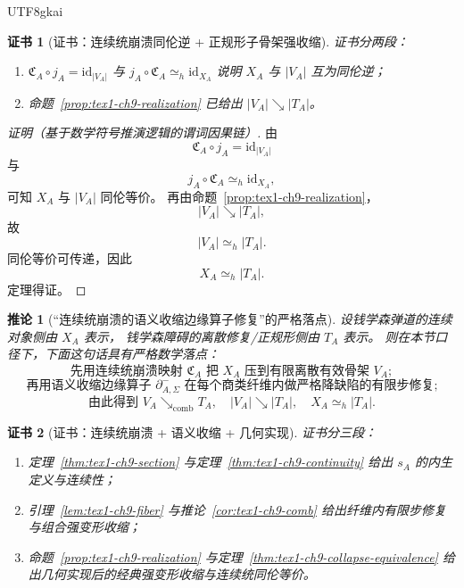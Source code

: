 \documentclass[12pt]{article}
\newtheorem{corollary}{推论}[section]
\newtheorem{Certificate}{证书}[section]
\newcommand{\id}{\mathrm{id}}
\begin{document}
\begin{CJK*}{UTF8}{gkai}
\begin{Certificate}[证书：连续统崩溃同伦逆 + 正规形子骨架强收缩]
\label{cert:tex1-ch9-collapse-equivalence}
证书分两段：
\begin{enumerate}
  \item \(\mathfrak C_A\circ j_A=\id_{|V_A|}\) 与 \(j_A\circ \mathfrak C_A \simeq_h \id_{X_A}\) 说明 \(X_A\) 与 \(|V_A|\)
    互为同伦逆；
  \item 命题~\ref{prop:tex1-ch9-realization} 已给出 \(|V_A|\searrow |T_A|\)。
\end{enumerate}
\end{Certificate}

\begin{proof}[证明（基于数学符号推演逻辑的谓词因果链）]
由
\[
  \mathfrak C_A\circ j_A=\id_{|V_A|}
\]
与
\[
  j_A\circ \mathfrak C_A \simeq_h \id_{X_A},
\]
可知 \(X_A\) 与 \(|V_A|\) 同伦等价。
再由命题~\ref{prop:tex1-ch9-realization}，
\[
  |V_A|\searrow |T_A|,
\]
故
\[
  |V_A|\simeq_h |T_A|.
\]
同伦等价可传递，因此
\[
  X_A \simeq_h |T_A|.
\]
定理得证。
\end{proof}

\begin{corollary}[“连续统崩溃的语义收缩边缘算子修复”的严格落点]
\label{cor:tex1-ch9-final}
设钱学森弹道的连续对象侧由 \(X_A\) 表示，
钱学森障碍的离散修复/正规形侧由 \(T_A\) 表示。
则在本节口径下，下面这句话具有严格数学落点：
\[
  \boxed{
    \text{先用连续统崩溃映射 }\mathfrak C_A\text{ 把 }X_A\text{ 压到有限离散有效骨架 }V_A;
  }
\]
\[
  \boxed{
    \text{再用语义收缩边缘算子 }\partial^-_{A,\Sigma}\text{ 在每个商类纤维内做严格降缺陷的有限步修复;}
  }
\]
\[
  \boxed{
    \text{由此得到 }V_A\searrow_{\mathrm{comb}}T_A,\quad |V_A|\searrow |T_A|,\quad X_A\simeq_h |T_A|.
  }
\]
\end{corollary}

\begin{Certificate}[证书：连续统崩溃 + 语义收缩 + 几何实现]
\label{cert:tex1-ch9-final}
证书分三段：
\begin{enumerate}
  \item 定理~\ref{thm:tex1-ch9-section} 与定理~\ref{thm:tex1-ch9-continuity} 给出 \(s_A\) 的内生定义与连续性；
  \item 引理~\ref{lem:tex1-ch9-fiber} 与推论~\ref{cor:tex1-ch9-comb} 给出纤维内有限步修复与组合强变形收缩；
  \item 命题~\ref{prop:tex1-ch9-realization} 与定理~\ref{thm:tex1-ch9-collapse-equivalence} 给出几何实现后的经典强变形收缩与连续统同伦等价。
\end{enumerate}
\end{Certificate}


\end{CJK*}
\end{document}
